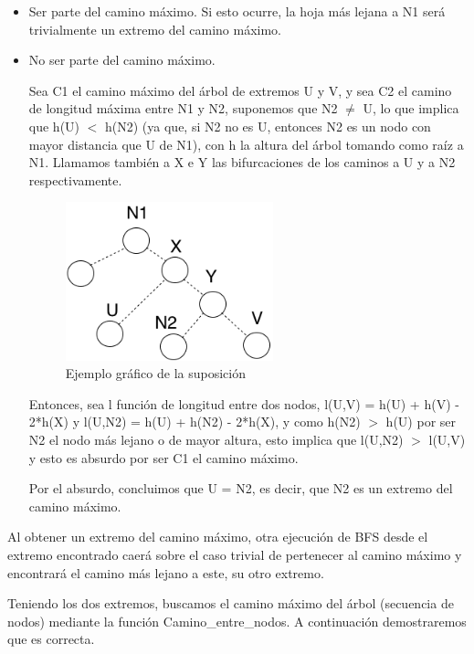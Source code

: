 \documentclass[a4paper, 10pt, twoside]{article}
\begin{document}
\begin{itemize}
  \item Ser parte del camino máximo. Si esto ocurre, la hoja más lejana a N1 será trivialmente un extremo del camino máximo.
  \item No ser parte del camino máximo.
  
  Sea C1 el camino máximo del árbol de extremos U y V, y sea C2 el camino de longitud máxima entre N1 y N2, suponemos que N2 $\neq$ U, lo que implica que h(U) $<$ h(N2) (ya que, si N2 no es U, entonces N2 es un nodo con mayor distancia que U de N1), con h la altura del árbol tomando como raíz a N1. Llamamos también a X e Y las bifurcaciones de los caminos a U y a N2 respectivamente.

\begin{figure}[ht!]
\centering
\includegraphics[width=60mm]{2b.png}
\caption{Ejemplo gráfico de la suposición}
\label{overflow}
\end{figure}  
  
  Entonces, sea l función de longitud entre dos nodos, l(U,V) = h(U) + h(V) - 2*h(X) y l(U,N2) = h(U) + h(N2) - 2*h(X), y como h(N2) $>$ h(U) por ser N2 el nodo más lejano o de mayor altura, esto implica que l(U,N2) $>$ l(U,V) y esto es absurdo por ser C1 el camino máximo.
  
  Por el absurdo, concluimos que U = N2, es decir, que N2 es un extremo del camino máximo.
\end{itemize}

Al obtener un extremo del camino máximo, otra ejecución de BFS desde el extremo encontrado caerá sobre el caso trivial de pertenecer al camino máximo y encontrará el camino más lejano a este, su otro extremo.

Teniendo los dos extremos, buscamos el camino máximo del árbol (secuencia de nodos) mediante la función Camino\_entre\_nodos. A continuación demostraremos que es correcta.
\end{document}
